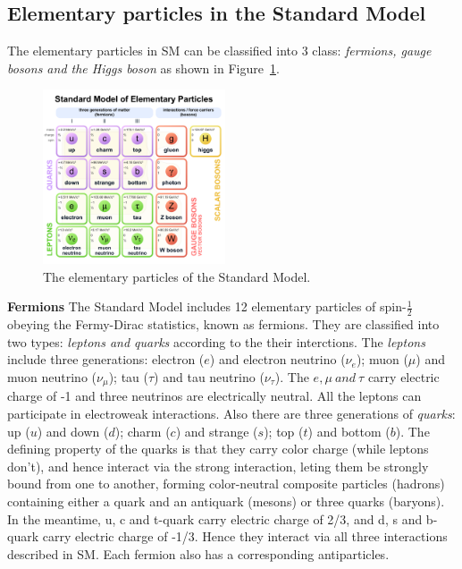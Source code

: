 \subsection{Elementary particles in the Standard Model}
\label{elementaryparticles}

The elementary particles in SM can be classified into 3 class: \textit{fermions, gauge bosons and the Higgs boson} as shown in Figure~\ref{fig:eleP-1}.
\begin{figure}[!htb]
  \centering
  \includegraphics[width=0.48\textwidth]{figures/Theory/Standard_Model_of_Elementary_Particles.pdf}
  \caption{The elementary particles of the Standard Model.}
  \label{fig:eleP-1}
\end{figure}

\textbf{Fermions}
The Standard Model includes 12 elementary particles of spin-$\frac{1}{2}$ obeying the Fermy-Dirac statistics, known as fermions. 
They are classified into two types: \textit{leptons and quarks} according to the their interctions.
The \textit{leptons} include three generations: electron ($e$) and electron neutrino ($\nu_{e}$); 
muon ($\mu$) and muon neutrino ($\nu_{\mu}$); tau ($\tau$) and tau neutrino ($\nu_{\tau}$).
The $e, \mu~and~\tau$ carry electric charge of -1 and three neutrinos are electrically neutral. 
All the leptons can participate in electroweak interactions.
Also there are three generations of \textit{quarks}: up ($u$) and down ($d$); charm ($c$) and strange ($s$); top ($t$) and bottom ($b$).
The defining property of the quarks is that they carry color charge (while leptons don't), and hence interact via the strong interaction, 
leting them be strongly bound from one to another, forming color-neutral composite 
particles (hadrons) containing either a quark and an antiquark (mesons) or three quarks (baryons).
In the meantime, u, c and t-quark carry electric charge of 2/3, and d, s and b-quark carry electric charge of -1/3. 
Hence they interact via all three interactions described in SM.
Each fermion also has a corresponding antiparticles.

